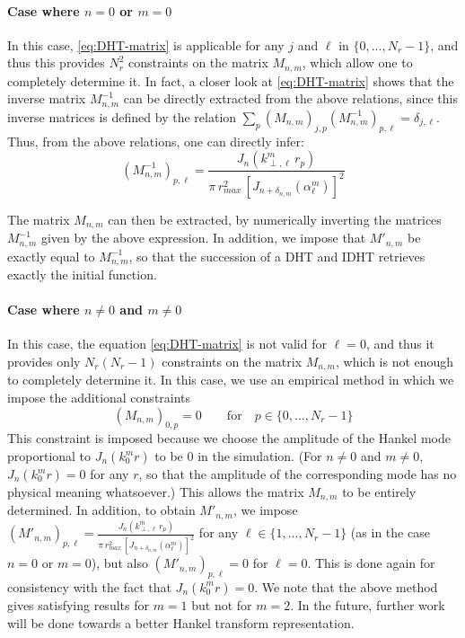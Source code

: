 \documentclass[1p,times]{elsarticle}
\begin{document}
\paragraph{Case where $n=0$ or $m=0$} In this case,
\cref{eq:DHT-matrix} is applicable for any $j$ and $\ell$ in  $\{ 0,
..., N_r-1 \}$, and thus this provides $N_r^2$ constraints on the matrix
$M_{n,m}$, which allow one to completely determine it. 
In fact, a closer look at \cref{eq:DHT-matrix} shows
that the inverse matrix $M^{-1}_{n,m}$ can be directly extracted from the above relations,
since this inverse matrices is defined by the relation $\sum_p (M_{n,m})_{j,p}
(M^{-1}_{n,m})_{p,\ell} = \delta_{j,\ell}$. Thus, from the above
relations, one can directly infer:
\begin{equation} (M_{n,m}^{-1})_{p,\ell} = \frac{ J_n(k^m_{\perp,\ell}\,r_p) } { \pi\,
  r_{max}^2\,[ J_{n+\delta_{n,m}}(\alpha_\ell^m)]^2  } \end{equation}

\noindent The matrix $M_{n,m}$ can then be extracted, by numerically inverting
the matrices  $M^{-1}_{n,m}$ given by the above expression. In
addition, we impose that $M'_{n,m}$ be exactly equal to
$M^{-1}_{n,m}$, so that the succession of a DHT and IDHT retrieves
exactly the initial function.

\paragraph{Case where $n \neq 0$ and $m \neq 0$} In this case, the
equation \cref{eq:DHT-matrix} is not valid for $\ell=0$, and thus it
provides only $N_r(N_r-1)$ constraints on the matrix $M_{n,m}$, which
is not enough to completely determine it. In this case, we use an
empirical method in which we impose the additional constraints
\begin{equation} (M_{n,m})_{0,p} = 0 \qquad \mathrm{for} \quad p \in \{ 0, ...,
N_r-1 \} \end{equation}
\noindent This constraint is imposed because we choose the amplitude of the
Hankel mode proportional to $J_{n}(k^m_0 r)$ to be 0 in the
simulation. (For $n\neq 0$ and $m \neq 0$, $J_n(k^m_0 r)=0$ for any
$r$, so that the amplitude of the corresponding mode has no physical
meaning whatsoever.) This allows the matrix
$M_{n,m}$ to be entirely determined. In addition, to obtain $M'_{n,m}$, we impose
$ (M'_{n,m})_{p,\ell}=\frac{ J_n(k^m_{\perp,\ell}\,r_p) } { \pi\,
  r_{max}^2\,[ J_{n+\delta_{n,m}}(\alpha_\ell^m)]^2  }$ for any $\ell \in \{1,
..., N_r-1 \}$ (as in the case $n=0$ or $m=0$), but also $(M'_{n,m})_{p,\ell}=0$ for
$\ell=0$. This is done again for consistency with the fact that
$J_n(k^m_0 r)=0$. We note that the
above method gives satisfying results for $m=1$ but not for $m=2$. 
In the future, further work will be done towards a better Hankel transform representation.
\end{document}

